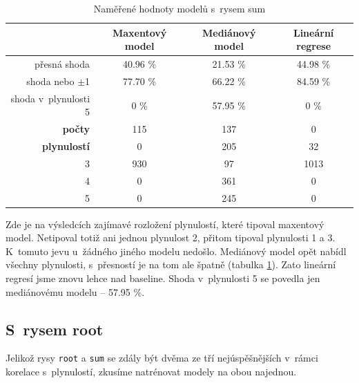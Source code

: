 \documentclass[12pt,a4paper]{report}
\begin{document}
\begin{table}[!htbp]
\begin{center}
\begin{tabular}{|r|c|c|c|}
\hline
 & \textbf{\scriptsize{ Maxentový model}} & \textbf{\scriptsize Mediánový model} & \textbf{\scriptsize Lineární regrese} \\
 \hline
 přesná shoda & 40.96 \%  & 21.53 \% & 44.98 \% \\
\hline
shoda nebo $\pm$1 & 77.70 \% & 66.22 \%  & 84.59 \% \\
\hline
shoda v~plynulosti 5 & \color{red}0 \% & 57.95 \% & \color{red}0 \% \\
\hline
     \textbf{počty} \quad 1 & 115   & 137   & \color{red} 0\\
\textbf{plynulostí} \quad 2 & \color{red}0 & 205  & 32 \\
                          3 & 930 & 97 & 1013 \\
                          4 & \color{red}0   & 361 & \color{red} 0 \\
                          5 & \color{red}0   & 245 & \color{red} 0  \\
\hline
\end{tabular}
\caption{Naměřené hodnoty modelů s~rysem sum}\label{tb:sum}
\end{center}
\end{table}

Zde je na výsledcích zajímavé rozložení plynulostí, které tipoval maxentový model. Netipoval totiž ani jednou plynulost 2, přitom tipoval plynulosti 1 a 3. K~tomuto jevu u~žádného jiného modelu nedošlo. Mediánový model opět nabídl všechny plynulosti, s~přesností je na tom ale špatně (tabulka \ref{tb:sum}). Zato lineární regresí jsme znovu lehce nad baseline. Shoda v~plynulosti 5 se povedla jen mediánovému modelu -- 57.95 \%.



\subsection{S~rysem root}
Jelikož rysy \texttt{root} a \texttt{sum} se zdály být dvěma ze tří nejúspěšnějších v~rámci korelace s~plynulostí, zkusíme natrénovat modely na obou najednou.
 
 
\end{document}
